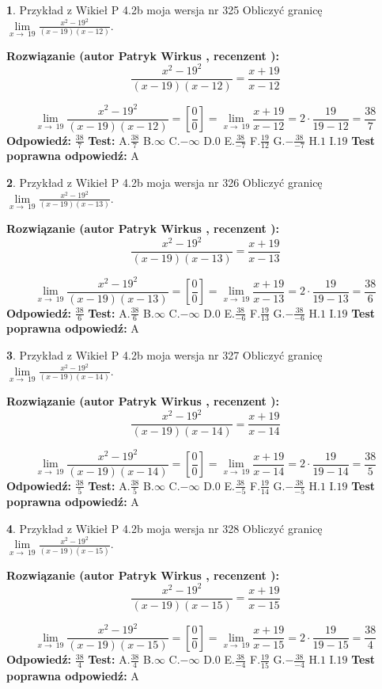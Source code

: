 \documentclass[12pt, a4paper]{article}
\theoremstyle{definition} %
\newtheorem{zad}{}
\newcommand{\zadStart}[1]{\begin{zad}#1\newline}
\newcommand{\zadStop}{\end{zad}}
\newcommand{\rozwStart}[2]{\noindent \textbf{Rozwiązanie (autor #1 , recenzent #2): }\newline}
\newcommand{\rozwStop}{\newline}
\newcommand{\odpStart}{\noindent \textbf{Odpowiedź:}\newline}
\newcommand{\odpStop}{\newline}
\newcommand{\testStart}{\noindent \textbf{Test:}\newline}
\newcommand{\testStop}{\newline}
\newcommand{\kluczStart}{\noindent \textbf{Test poprawna odpowiedź:}\newline}
\newcommand{\kluczStop}{\newline}
\begin{document}
\zadStart{Przykład z Wikieł P 4.2b moja wersja nr 325}
Obliczyć granicę $\lim\limits_{x\to\ 19}\frac{x^{2}-19^{2}}{(x-19)(x-12)}$.
\zadStop
\rozwStart{Patryk Wirkus}{}
$$\frac{x^{2}-19^{2}}{(x-19)(x-12)}=\frac{x+19}{x-12}$$

$$\lim\limits_{x\to\ 19}\frac{x^{2}-19^{2}}{(x-19)(x-12)}=[\frac{0}{0}]=\lim\limits_{x\to\ 19}\frac{x+19}{x-12}=2 \cdot \frac{19}{19-12} = \frac{38}{7}$$
\rozwStop
\odpStart
$\frac{38}{7}$
\odpStop
\testStart
A.$\frac{38}{7}$
B.$\infty$
C.$-\infty$
D.$0$
E.$\frac{38}{-7}$
F.$\frac{19}{12}$
G.$-\frac{38}{-7}$
H.$1$
I.$19$
\testStop
\kluczStart
A
\kluczStop



\zadStart{Przykład z Wikieł P 4.2b moja wersja nr 326}
Obliczyć granicę $\lim\limits_{x\to\ 19}\frac{x^{2}-19^{2}}{(x-19)(x-13)}$.
\zadStop
\rozwStart{Patryk Wirkus}{}
$$\frac{x^{2}-19^{2}}{(x-19)(x-13)}=\frac{x+19}{x-13}$$

$$\lim\limits_{x\to\ 19}\frac{x^{2}-19^{2}}{(x-19)(x-13)}=[\frac{0}{0}]=\lim\limits_{x\to\ 19}\frac{x+19}{x-13}=2 \cdot \frac{19}{19-13} = \frac{38}{6}$$
\rozwStop
\odpStart
$\frac{38}{6}$
\odpStop
\testStart
A.$\frac{38}{6}$
B.$\infty$
C.$-\infty$
D.$0$
E.$\frac{38}{-6}$
F.$\frac{19}{13}$
G.$-\frac{38}{-6}$
H.$1$
I.$19$
\testStop
\kluczStart
A
\kluczStop



\zadStart{Przykład z Wikieł P 4.2b moja wersja nr 327}
Obliczyć granicę $\lim\limits_{x\to\ 19}\frac{x^{2}-19^{2}}{(x-19)(x-14)}$.
\zadStop
\rozwStart{Patryk Wirkus}{}
$$\frac{x^{2}-19^{2}}{(x-19)(x-14)}=\frac{x+19}{x-14}$$

$$\lim\limits_{x\to\ 19}\frac{x^{2}-19^{2}}{(x-19)(x-14)}=[\frac{0}{0}]=\lim\limits_{x\to\ 19}\frac{x+19}{x-14}=2 \cdot \frac{19}{19-14} = \frac{38}{5}$$
\rozwStop
\odpStart
$\frac{38}{5}$
\odpStop
\testStart
A.$\frac{38}{5}$
B.$\infty$
C.$-\infty$
D.$0$
E.$\frac{38}{-5}$
F.$\frac{19}{14}$
G.$-\frac{38}{-5}$
H.$1$
I.$19$
\testStop
\kluczStart
A
\kluczStop



\zadStart{Przykład z Wikieł P 4.2b moja wersja nr 328}
Obliczyć granicę $\lim\limits_{x\to\ 19}\frac{x^{2}-19^{2}}{(x-19)(x-15)}$.
\zadStop
\rozwStart{Patryk Wirkus}{}
$$\frac{x^{2}-19^{2}}{(x-19)(x-15)}=\frac{x+19}{x-15}$$

$$\lim\limits_{x\to\ 19}\frac{x^{2}-19^{2}}{(x-19)(x-15)}=[\frac{0}{0}]=\lim\limits_{x\to\ 19}\frac{x+19}{x-15}=2 \cdot \frac{19}{19-15} = \frac{38}{4}$$
\rozwStop
\odpStart
$\frac{38}{4}$
\odpStop
\testStart
A.$\frac{38}{4}$
B.$\infty$
C.$-\infty$
D.$0$
E.$\frac{38}{-4}$
F.$\frac{19}{15}$
G.$-\frac{38}{-4}$
H.$1$
I.$19$
\testStop
\kluczStart
A
\kluczStop
\end{document}
